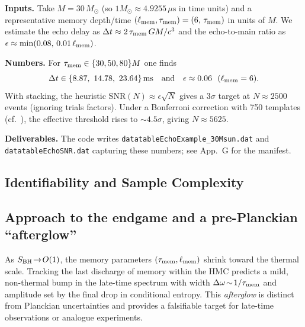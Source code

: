 \documentclass[aps,prd,preprint,onecolumn,superscriptaddress,nofootinbib,longbibliography,floatfix,11pt,showpacs,showkeys]{revtex4-2}
\theoremstyle{plain}
\theoremstyle{definition}
\theoremstyle{remark}
\begin{document}
\noindent\textbf{Inputs.} Take $M=30\,M_\odot$ (so $1M_\odot\approx 4.9255\,\mu\mathrm{s}$ in time units) and a representative memory depth/time $(\ell_{\rm mem},\tau_{\rm mem})=(6,\,\tau_{\rm mem})$ in units of $M$. We estimate the echo delay as $\Delta t \approx 2\,\tau_{\rm mem}\,GM/c^3$ and the echo-to-main ratio as $\epsilon\approx \min(0.08,\,0.01\,\ell_{\rm mem})$.

\noindent\textbf{Numbers.} For $\tau_{\rm mem}\in\{30,50,80\}M$ one finds
\[
\Delta t \in \{8.87,\ 14.78,\ 23.64\}\,\mathrm{ms}\quad\text{and}\quad \epsilon\approx 0.06\ \ (\ell_{\rm mem}=6).
\]
With stacking, the heuristic $\mathrm{SNR}(N)\approx \epsilon\sqrt{N}$ gives a $3\sigma$ target at $N\approx 2500$ events (ignoring trials factors). Under a Bonferroni correction with {750} templates (cf.\ ), the effective threshold rises to $\sim 4.5\sigma$, giving $N\approx 5625$.

\noindent\textbf{Deliverables.} The code writes \texttt{datatableEchoExample\_30Msun.dat} and \texttt{datatableEchoSNR.dat} capturing these numbers; see App.~G for the manifest.

\subsection{Identifiability and Sample Complexity}

\subsection*{Approach to the endgame and a pre-Planckian ``afterglow''}
\label{sec:afterglow}
As $S_{\rm BH}\!\to\!O(1)$, the memory parameters $(\tau_{\rm mem},\ell_{\rm mem})$ shrink toward the thermal scale.
Tracking the last discharge of memory within the HMC predicts a mild, non-thermal bump in the late-time spectrum with width $\Delta\omega\!\sim\!1/\tau_{\rm mem}$ and amplitude set by the final drop in conditional entropy.
This \emph{afterglow} is distinct from Planckian uncertainties and provides a falsifiable target for late-time observations or analogue experiments.

\end{document}
